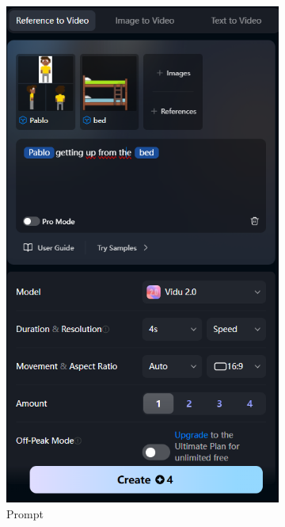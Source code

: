 \begin{figure}[htbp]
    \centering
    \caption{\small Processo da utilização 1 do Vidu em agosto/2025}
    \label{fig:vidu6}
    \begin{subfigure}{0.35\linewidth}
        \includegraphics[width=1\linewidth]{figs/vidu/tela6.PNG}
        \caption{\small Prompt}
        \label{fig:vidu6a}
    \end{subfigure}
    \begin{subfigure}{0.55\linewidth}

\end{subfigure}
\end{figure}
